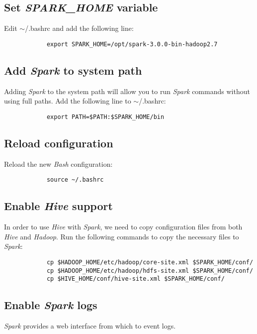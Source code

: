 \documentclass{article}
\begin{document}
        \subsection{Set \emph{SPARK\_HOME} variable}
        Edit $\sim$/.bashrc and add the following line:
        \begin{verbatim}
            export SPARK_HOME=/opt/spark-3.0.0-bin-hadoop2.7
        \end{verbatim}

        \subsection{Add \emph{Spark} to system path}
        Adding \emph{Spark} to the system path will allow you to run \emph{Spark} commands without
        using full paths. Add the following line to $\sim$/.bashrc:
        \begin{verbatim}
            export PATH=$PATH:$SPARK_HOME/bin
        \end{verbatim}

        \subsection{Reload configuration}
        Reload the new \emph{Bash} configuration:
        \begin{verbatim}
            source ~/.bashrc
        \end{verbatim}

        \subsection{Enable \emph{Hive} support}
        In order to use \emph{Hive} with \emph{Spark}, we need to copy configuration files from both
        \emph{Hive} and \emph{Hadoop}. Run the following commands to copy the necessary files to \emph{Spark}:
        \begin{verbatim}
            cp $HADOOP_HOME/etc/hadoop/core-site.xml $SPARK_HOME/conf/
            cp $HADOOP_HOME/etc/hadoop/hdfs-site.xml $SPARK_HOME/conf/
            cp $HIVE_HOME/conf/hive-site.xml $SPARK_HOME/conf/
        \end{verbatim}

        \subsection{Enable \emph{Spark} logs}
        \emph{Spark} provides a web interface from which to event logs.
\end{document}
